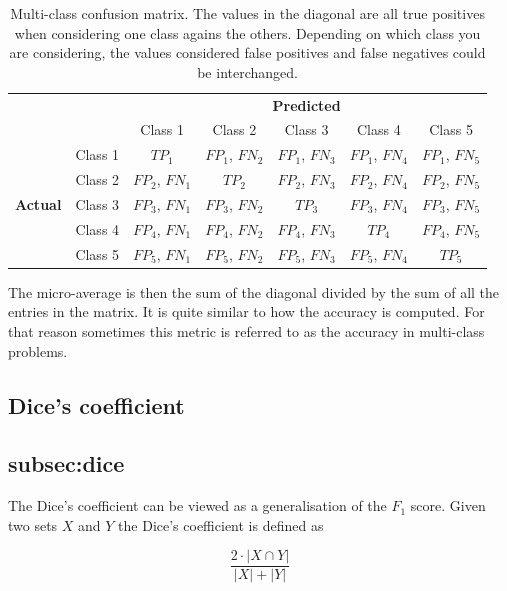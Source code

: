 \begin{table}[ht]
\centering
\caption{Multi-class confusion matrix. The values in the diagonal are all true positives when considering one class agains the others. Depending on which class you are considering, the values considered false positives and false negatives could be interchanged.}
\begin{tabular}{c c c|c|c|c|c|}
& & \multicolumn{5}{c}{\textbf{Predicted}} \\ \cline{3-7}
& & \multicolumn{1}{|c|}{Class 1} & Class 2 & Class 3 & Class 4 & Class 5 \\ \cline{2-7}
\multirow{5}{*}{\textbf{Actual}} 
 & \multicolumn{1}{|c|}{Class 1} & $TP_1$ & $FP_1$, $FN_2$ & $FP_1$, $FN_3$ & $FP_1$, $FN_4$ & $FP_1$, $FN_5$ \\ \cline{2-7}
 & \multicolumn{1}{|c|}{Class 2} & $FP_2$, $FN_1$ & $TP_2$ & $FP_2$, $FN_3$ & $FP_2$, $FN_4$ & $FP_2$, $FN_5$ \\ \cline{2-7}
 & \multicolumn{1}{|c|}{Class 3} & $FP_3$, $FN_1$ & $FP_3$, $FN_2$ & $TP_3$ & $FP_3$, $FN_4$ & $FP_3$, $FN_5$ \\ \cline{2-7}
 & \multicolumn{1}{|c|}{Class 4} & $FP_4$, $FN_1$ & $FP_4$, $FN_2$ & $FP_4$, $FN_3$ & $TP_4$ & $FP_4$, $FN_5$ \\ \cline{2-7}
 & \multicolumn{1}{|c|}{Class 5} & $FP_5$, $FN_1$ & $FP_5$, $FN_2$ & $FP_5$, $FN_3$ & $FP_5$, $FN_4$ & $TP_5$ \\ \cline{2-7}
\end{tabular}
\label{table:confusion_matrix3}
\end{table}

The micro-average is then the sum of the diagonal divided by the sum of all the entries in the matrix. It is quite similar to how the accuracy is computed. For that reason sometimes this metric is referred to as the accuracy in multi-class problems.

\newpage
\subsection{Dice's coefficient}\subsection{subsec:dice}

The Dice's coefficient can be viewed as a generalisation of the $F_1$ score. Given two sets $X$ and $Y$ the Dice's coefficient is defined as 

\begin{equation}
    \frac{2\cdot |X \cap Y|}{|X| + |Y|}
\end{equation}

